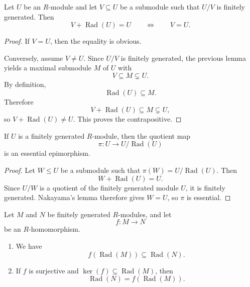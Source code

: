 \begin{theorem}
    Let $U$ be an $R$-module and let $V\subseteq U$ be a submodule such that $U/V$ is
    finitely generated. Then
    \[
        V+\operatorname{Rad}(U)=U
        \qquad \Longleftrightarrow \qquad
        V=U.
    \]
\end{theorem}

\begin{proof}
    If $V=U$, then the equality is obvious.

    Conversely, assume $V\neq U$. Since $U/V$ is finitely generated, the previous lemma
    yields a maximal submodule $M$ of $U$ with
    \[
        V\subseteq M\subsetneq U.
    \]
    By definition,
    \[
        \operatorname{Rad}(U)\subseteq M.
    \]
    Therefore
    \[
        V+\operatorname{Rad}(U)\subseteq M\subsetneq U,
    \]
    so $V+\operatorname{Rad}(U)\neq U$. This proves the contrapositive.
\end{proof}

\begin{corollary}
    If $U$ is a finitely generated $R$-module, then the quotient map
    \[
        \pi:U\to U/\operatorname{Rad}(U)
    \]
    is an essential epimorphism.
\end{corollary}

\begin{proof}
    Let $W\leq U$ be a submodule such that $\pi(W)=U/\operatorname{Rad}(U)$. Then
    \[
        W+\operatorname{Rad}(U)=U.
    \]
    Since $U/W$ is a quotient of the finitely generated module $U$, it is finitely
    generated. Nakayama's lemma therefore gives $W=U$, so $\pi$ is essential.
\end{proof}

\begin{lemma}
    Let $M$ and $N$ be finitely generated $R$-modules, and let
    \[
        f:M\to N
    \]
    be an $R$-homomorphism.
    \begin{enumerate}
        \item We have
              \[
                  f(\operatorname{Rad}(M))\subseteq \operatorname{Rad}(N).
              \]
        \item If $f$ is surjective and $\ker(f)\subseteq \operatorname{Rad}(M)$, then
              \[
                  \operatorname{Rad}(N)=f(\operatorname{Rad}(M)).
              \]
    \end{enumerate}
\end{lemma}

